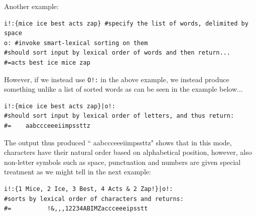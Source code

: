 \documentclass[a4paper, 18pt]{book} %
\begin{document}
{\vspace{2em}

Another example:

\vspace{2em}


  \begin{tcolorbox}[teaterminalstyle, title=O: EXAMPLE 2: Sort a list of words, breakable]
  \begin{lstlisting}[language=TEA,breaklines=true,]
i!:{mice ice best acts zap} #specify the list of words, delimited by space
o: #invoke smart-lexical sorting on them
#should sort input by lexical order of words and then return...
#=acts best ice mice zap
   \end{lstlisting}
  \end{tcolorbox}


\vspace{2em}

However, if we instead use \texttt{O!:} in the above example, we instead produce something unlike a list of sorted words as can be seen in the example below...


\vspace{2em}


  \begin{tcolorbox}[teaterminalstyle, title=O: EXAMPLE 3: Sort a list of words by character, breakable]
  \begin{lstlisting}[language=TEA,breaklines=true,]
i!:{mice ice best acts zap}|o!:
#should sort input by lexical order of letters, and thus return:
#=    aabccceeeiimpssttz
   \end{lstlisting}
  \end{tcolorbox}


\vspace{2em}


The output thus produced ``    aabccceeeiimpssttz" shows that in this mode, characters have their natural order based on alphabetical position, however, also non-letter symbols such as space, punctuation and numbers are given special treatment as we might tell in the next example:


\vspace{2em}


  \begin{tcolorbox}[teaterminalstyle, title=O: EXAMPLE 4: Sort a list of words by character, breakable]
  \begin{lstlisting}[language=TEA,breaklines=true,]
i!:{1 Mice, 2 Ice, 3 Best, 4 Acts & 2 Zap!}|o!:
#sorts by lexical order of characters and returns:
#=          !&,,,12234ABIMZaccceeeipsstt
   \end{lstlisting}
  \end{tcolorbox}


}
\end{document}
